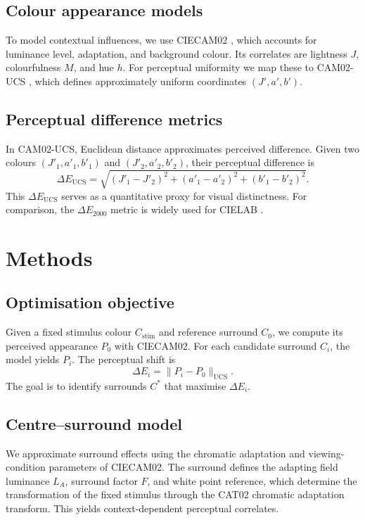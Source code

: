 \documentclass[11pt]{article}
\begin{document}
\subsection{Colour appearance models}
To model contextual influences, we use CIECAM02 \parencite{CIECAM02}, which accounts for luminance level, adaptation, and background colour. Its correlates are lightness $J$, colourfulness $M$, and hue $h$. For perceptual uniformity we map these to CAM02-UCS \parencite{fairchild2013color}, which defines approximately uniform coordinates $(J',a',b')$.

\subsection{Perceptual difference metrics}
In CAM02-UCS, Euclidean distance approximates perceived difference. Given two colours $(J'_1,a'_1,b'_1)$ and $(J'_2,a'_2,b'_2)$, their perceptual difference is
\begin{equation}
\Delta E_{\mathrm{UCS}} = \sqrt{(J'_1 - J'_2)^2 + (a'_1 - a'_2)^2 + (b'_1 - b'_2)^2}.
\end{equation}
This $\Delta E_{\mathrm{UCS}}$ serves as a quantitative proxy for visual distinctness. For comparison, the $\Delta E_{2000}$ metric is widely used for CIELAB \parencite{Luo2006}.

\section{Methods}
\subsection{Optimisation objective}
Given a fixed stimulus colour $C_{\text{stim}}$ and reference surround $C_{0}$, we compute its perceived appearance $P_{0}$ with CIECAM02. For each candidate surround $C_i$, the model yields $P_i$. The perceptual shift is
\begin{equation}
\Delta E_i = \lVert P_i - P_{0}\rVert_{\mathrm{UCS}}.
\end{equation}
The goal is to identify surrounds $C^*$ that maximise $\Delta E_i$.

\subsection{Centre–surround model}
We approximate surround effects using the chromatic adaptation and viewing-condition parameters of CIECAM02. The surround defines the adapting field luminance $L_A$, surround factor $F$, and white point reference, which determine the transformation of the fixed stimulus through the CAT02 chromatic adaptation transform. This yields context-dependent perceptual correlates.
\end{document}
